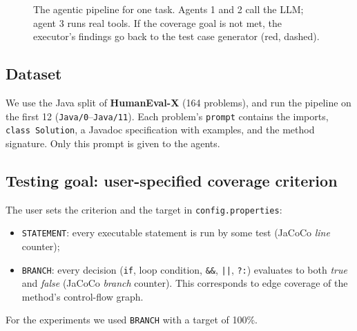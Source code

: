 \documentclass[11pt,a4paper]{article}
\begin{document}
\begin{figure}[H]
\caption{The agentic pipeline for one task. Agents 1 and 2 call the LLM; agent 3 runs real tools. If the coverage goal is not met, the executor's findings go back to the test case generator (red, dashed).}
\label{fig:pipeline}
\end{figure}

\subsection{Dataset}
We use the Java split of \textbf{HumanEval-X} (164 problems), and run the pipeline on the first 12 (\texttt{Java/0}--\texttt{Java/11}). Each problem's \texttt{prompt} contains the imports, \texttt{class Solution}, a Javadoc specification with examples, and the method signature. Only this prompt is given to the agents.

\subsection{Testing goal: user-specified coverage criterion}
The user sets the criterion and the target in \texttt{config.properties}:
\begin{itemize}
  \item \texttt{STATEMENT}: every executable statement is run by some test (JaCoCo \emph{line} counter);
  \item \texttt{BRANCH}: every decision (\texttt{if}, loop condition, \texttt{\&\&}, \texttt{||}, \texttt{?:}) evaluates to both \emph{true} and \emph{false} (JaCoCo \emph{branch} counter). This corresponds to edge coverage of the method's control-flow graph.
\end{itemize}
For the experiments we used \texttt{BRANCH} with a target of 100\%.
\end{document}
